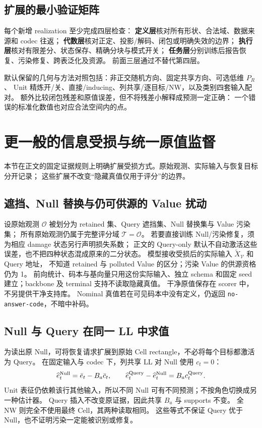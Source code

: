 \documentclass[11pt,UTF8,fontset=fandol]{ctexart}
\numberwithin{equation}{section}
\theoremstyle{definition}
\newcommand{\Oset}{\mathcal O}
\newcommand{\Vset}{\mathcal V}
\newcommand{\TargetSet}{\mathcal T}
\begin{document}
\subsection{扩展的最小验证矩阵}
每个新增 realization 至少完成四层检查：
\textbf{定义层}核对所有形状、合法域、数据来源和 codec 往返；
\textbf{代数层}核对正定、投影/解码、闭包或明确失效的边界；
\textbf{执行层}核对有限差分、状态保存、精确分块与模式开关；
\textbf{任务层}分别训练后报告恢复、污染修复、跨表泛化及资源。
前面三层通过不替代第四层。

默认保留的几何与方法对照包括：非正交随机方向、固定共享方向、可选低维 $P_R$、
Unit 精炼开/关、直接/inducing、列共享/逐目标/NW，以及类别四套输入配对。
额外比较闭包残差和原值误差，但不将残差小解释成预测一定正确：
一个错误的标准化数值也对应合法空间内的点。



\section{更一般的信息受损与统一原值监督}
\label{sec:alt:damage-restoration}
本节在正文的固定证据规则上明确扩展受损方式。原始观测、实际输入与恢复目标分开记录；
这些扩展不改变“隐藏真值仅用于评分”的边界。

\subsection{遮挡、Null 替换与仍可供源的 Value 扰动}
设原始观测 $\Oset$ 被划分为 retained 集、Query 遮挡集、Null 替换集与 Value 污染集；
所有原始观测仍属于完整评分域 $\TargetSet=\Oset$。
若要直接训练 Null/污染修复，须为相应 damage 状态另行声明损失系数；
正文的 Query-only 默认不自动激活这些误差，也不把四种状态混成原来的二分状态。
模型接收受损后的实际输入 $\widetilde X_{\Vset}$ 和 Query 地址，
不知道 retained 与 polluted Value 的区分；污染 Value 的供源资格仍为 1。
前向统计、码本与基向量只用这份实际输入、独立 schema 和固定 seed 建立；backbone 及 terminal 支持不读取隐藏真值。
干净原值保存在 scorer 中，不另提供干净支持库。
Nominal 真值若在可见码本中没有定义，仍返回 \texttt{no-answer-code}，不暗中补码。

\subsection{Null 与 Query 在同一 LL 中求值}
\label{subsec:alt:damage-ll}
为读出原 Null，可将恢复请求扩展到原始 Cell rectangle，不必将每个目标都激活为 Query。
在固定输入与 codec 下，列共享 LL 对 Null 使用 $c_t=0$：
\begin{equation}
 \widehat e_t^{\rm Null}=\bar e_t-B_a\bar c_t,\qquad
 \widehat e_t^{\rm Query}-\widehat e_t^{\rm Null}=B_ac_t^{\rm Query}.
 \label{v51:eq:damage-null-query}
\end{equation}
Unit 表征仍依赖该行其他输入，所以不同 Null 可有不同预测；不按角色切换成另一种估计器。
Query 插入不改变原证据，因此共享 $B_a$ 与 supports 不变。
全 NW 则完全不使用最终 Cell，其两种读取相同。
这些等式不保证 Query 优于 Null，也不证明污染一定能被识别或修复。
\end{document}
